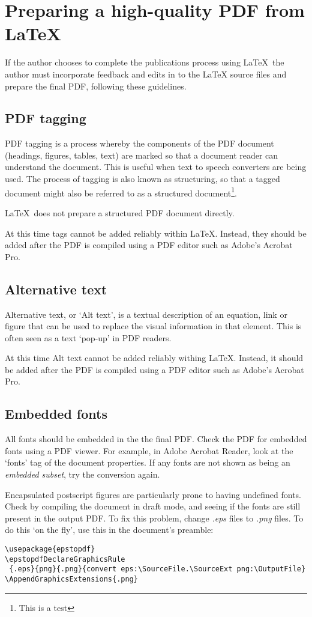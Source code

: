 \section{Preparing a high-quality PDF from LaTeX}\label{sec:PDFprep}
If the author chooses to complete the publications process using LaTeX\, the author must incorporate feedback and edits in to the LaTeX source files and prepare the final PDF, following these guidelines.

\subsection{PDF tagging}\label{sec:PDFtagging}
PDF tagging is a process whereby the components of the PDF document (headings, figures, tables, text) are marked so that a document reader can understand the document. This is useful when text to speech converters are being used. The process of tagging is also known as structuring, so that a tagged document might also be referred to as a structured document\footnote{This is a test}.

\LaTeX\ does not prepare a structured PDF document directly.

At this time tags cannot be added reliably within LaTeX. Instead, they should be added after the PDF is compiled using a PDF editor such as Adobe's Acrobat Pro. 

\subsection{Alternative text}\label{sec:Alttext}
Alternative text, or `Alt text', is a textual description of an equation, link or figure that can be used to replace the visual information in that element. This is often seen as a text `pop-up' in PDF readers. 

At this time Alt text cannot be added reliably withing LaTeX. Instead, it should be added after the PDF is compiled using a PDF editor such as Adobe's Acrobat Pro. 

\subsection{Embedded fonts}
All fonts should be embedded in the the final PDF. Check the PDF for embedded fonts using a PDF viewer. For example, in Adobe Acrobat Reader, look at the `fonts' tag of the document properties. If any fonts are not shown as being an \emph{embedded subset}, try the conversion again. 

Encapsulated postscript figures are particularly prone to having undefined fonts. Check by compiling the document in draft mode, and seeing if the fonts are still present in the output PDF. To fix this problem, change \emph{.eps} files to \emph{.png} files. To do this `on the fly', use this in the document's preamble:

\begin{lstlisting}
\usepackage{epstopdf}
\epstopdfDeclareGraphicsRule
 {.eps}{png}{.png}{convert eps:\SourceFile.\SourceExt png:\OutputFile}
\AppendGraphicsExtensions{.png}
\end{lstlisting}